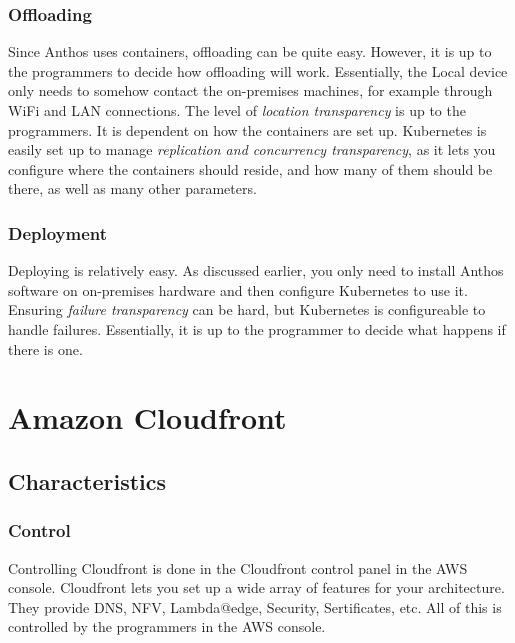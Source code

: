 \subsubsection{Offloading}
Since Anthos uses containers, offloading can be quite easy. However, it is up to the programmers to decide how offloading will work. Essentially, the Local device only needs to somehow contact the on-premises machines, for example through WiFi and LAN connections. The level of \textit{location transparency} is up to the programmers. It is dependent on how the containers are set up. Kubernetes is easily set up to manage \textit{replication and concurrency transparency}, as it lets you configure where the containers should reside, and how many of them should be there, as well as many other parameters.

\subsubsection{Deployment}
Deploying is relatively easy. As discussed earlier, you only need to install Anthos software on on-premises hardware and then configure Kubernetes to use it. Ensuring \textit{failure transparency} can be hard, but Kubernetes is configureable to handle failures. Essentially, it is up to the programmer to decide what happens if there is one.













\section{Amazon Cloudfront}
\subsection{Characteristics}
\subsubsection{Control}
Controlling Cloudfront is done in the Cloudfront control panel in the AWS console. Cloudfront lets you set up a wide array of features for your architecture. They provide DNS, NFV, Lambda@edge, Security, Sertificates, etc. All of this is controlled by the programmers in the AWS console.  


